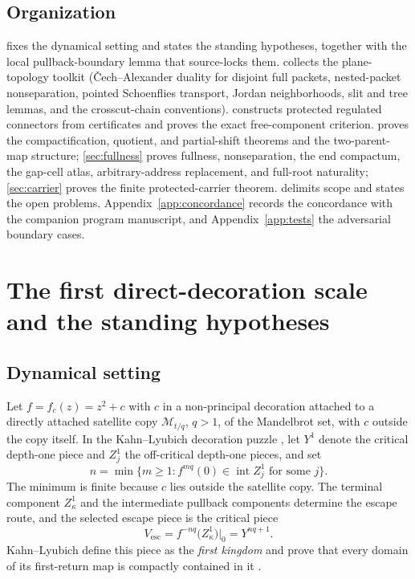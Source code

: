 \documentclass[11pt,reqno]{amsart}
\numberwithin{equation}{section}
\theoremstyle{plain}
\theoremstyle{definition}
\theoremstyle{remark}
\begin{document}
\subsection{Organization}

 fixes the dynamical setting and states the standing
hypotheses, together with the local pullback-boundary lemma that
source-locks them.   collects the plane-topology
toolkit (\v Cech--Alexander duality for disjoint full packets,
nested-packet nonseparation, pointed Schoenflies transport, Jordan
neighborhoods, slit and tree lemmas, and the crosscut-chain
conventions).   constructs protected regulated
connectors from certificates and proves the exact free-component
criterion.   proves the compactification,
quotient, and partial-shift theorems and the two-parent-map structure;
\cref{sec:fullness} proves fullness, nonseparation, the end compactum,
the gap-cell atlas, arbitrary-address replacement, and full-root
naturality; \cref{sec:carrier} proves the finite protected-carrier
theorem.   delimits scope and states the open problems.
Appendix~\ref{app:concordance} records the concordance with the
companion program manuscript, and Appendix~\ref{app:tests} the
adversarial boundary cases.

\section{The first direct-decoration scale and the standing hypotheses}
\label{sec:setting}

\subsection{Dynamical setting}
\label{sec:setting-dynamics}

Let $f=f_c(z)=z^2+c$ with $c$ in a non-principal decoration attached to a
directly attached satellite copy $\mathcal M_{t/q}$, $q>1$, of the
Mandelbrot set, with $c$ outside the copy itself.  In the Kahn--Lyubich
decoration puzzle \cite{KLDecorations08}, let $Y^1$ denote the critical
depth-one piece and $Z^1_j$ the off-critical depth-one pieces, and set
\begin{equation}
 n=\min\{m\ge1: f^{mq}(0)\in\operatorname{int}Z^1_j
   \text{ for some }j\}.
\label{eq:DS1}
\end{equation}
The minimum is finite because $c$ lies outside the satellite copy.  The
terminal component $Z^1_\kappa$ and the intermediate pullback components
determine the escape route, and the selected escape piece is the critical
piece
\begin{equation}
 V_{\mathrm{esc}}
 =
 f^{-nq}\bigl(Z^1_\kappa\bigr)\big|_0
 =
 Y^{nq+1}.
\label{eq:DS2}
\end{equation}
Kahn--Lyubich define this piece as the \emph{first kingdom} and prove
that every domain of its first-return map is compactly contained in it
\cite{KLDecorations08,KLPrincipal09}.
\end{document}
